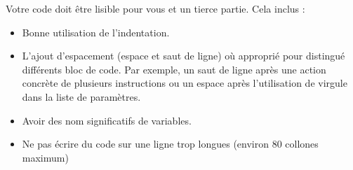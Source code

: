 Votre code doit être lisible pour vous et un tierce partie. Cela inclus :
\begin{itemize}
    \item Bonne utilisation de l'indentation.
    \item L'ajout d'espacement (espace et saut de ligne) où approprié pour distingué différents bloc de code. Par exemple, un saut de ligne après une action concrète de plusieurs instructions ou un espace après l'utilisation de virgule dans la liste de paramètres.
    \item Avoir des nom significatifs de variables.
    \item Ne pas écrire du code sur une ligne trop longues (environ 80 collones maximum)
\end{itemize}